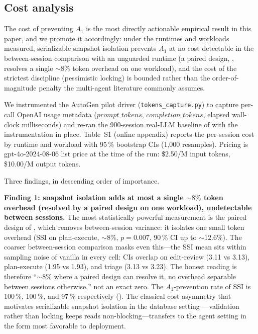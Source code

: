 \documentclass[journal,compsoc,10pt]{IEEEtran}
\providecommand{\citep}{\cite}
\theoremstyle{definition}
\theoremstyle{remark}
\newcommand{\fld}[1]{\mathit{#1}}
\begin{document}
\subsection{Cost analysis}
\label{sec:cost-analysis}
The cost of preventing $A_1$ is the most directly actionable empirical
result in this paper, and we promote it accordingly: under the runtimes and
workloads measured, serializable snapshot isolation prevents $A_1$ at no cost
detectable in the between-session comparison with an unguarded runtime (a
paired design, , resolves a single ${\sim}8\%$ token
overhead on one workload), and the cost of
the strictest discipline (pessimistic locking) is bounded rather than the
order-of-magnitude penalty the multi-agent literature commonly assumes.

We instrumented the AutoGen pilot driver
(\texttt{tokens\_capture.py}) to capture per-call OpenAI usage
metadata ($\fld{prompt\_tokens}$, $\fld{completion\_tokens}$,
elapsed wall-clock milliseconds) and re-ran the 900-session
real-LLM baseline of  with the
instrumentation in place. Table~S1 (online appendix) reports the
per-session cost by runtime and workload with 95\,\% bootstrap
CIs (1{,}000 resamples). Pricing is gpt-4o-2024-08-06 list price
at the time of the run: \$2.50/M input tokens, \$10.00/M output
tokens.


\noindent
Three findings, in descending order of importance.

\medskip
\noindent\textbf{Finding 1: snapshot isolation adds at most a single
${\sim}8\%$ token overhead (resolved by a paired design on one workload),
undetectable between sessions.}
The most statistically powerful measurement is the paired design of
, which removes between-session variance: it isolates
one small token overhead (SSI on plan-execute, ${\sim}8\%$, $p{=}0.007$,
90\,\% CI up to ${\sim}12.6\%$). The coarser between-session comparison
masks even this---the SSI mean sits within sampling noise of vanilla in
every cell: CIs overlap on edit-review (3.11 vs 3.13), plan-execute (1.95
vs 1.93), and triage (3.13 vs 3.23). The honest reading is therefore
``${\sim}8\%$ where a paired design can resolve it, no overhead separable
between sessions otherwise,'' not an exact zero. The $A_1$-prevention
rate of SSI is 100\,\%, 100\,\%, and 97\,\% respectively
(). The classical cost asymmetry that
motivates serializable snapshot isolation in the database setting
\citep{CahillRohmFekete2008SSI}---validation rather than locking keeps
reads non-blocking---transfers to the agent setting in the form most
favorable to deployment.
\end{document}
